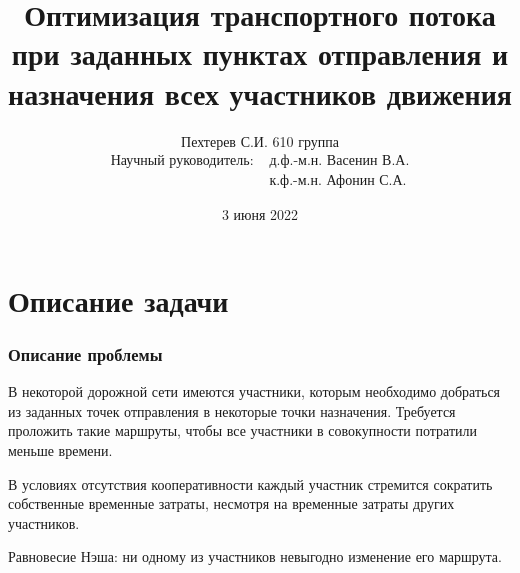 \documentclass{beamer}
\begin{document}
\title{Оптимизация транспортного потока при заданных пунктах отправления и назначения всех участников движения}
\author{Пехтерев С.И. 610 группа
	\begin{align*}
		\text{Научный руководитель:} & \text{ д.ф.-м.н. Васенин В.А.} \\
		\text{} & \text{ к.ф.-м.н. Афонин С.А.}
	\end{align*}}
\date[03.06.2022]{3 июня 2022}

\maketitle



\section{Описание задачи}

\begin{frame}\frametitle{Описание проблемы}
	В некоторой дорожной сети имеются участники, которым необходимо добраться из заданных точек отправления в некоторые точки назначения. Требуется проложить такие маршруты,  чтобы все участники в совокупности потратили меньше времени.
	
	\bigskip
	В условиях отсутствия кооперативности каждый участник стремится сократить собственные временные затраты, несмотря на временные затраты других участников.
	
	\bigskip
	Равновесие Нэша: ни одному из участников невыгодно изменение его маршрута.
	
\end{frame}
\end{document}
